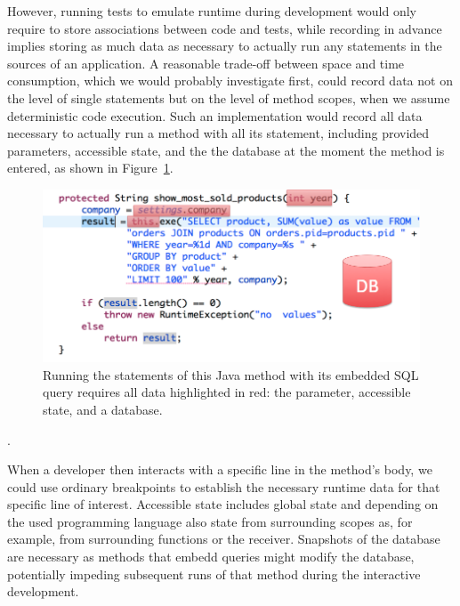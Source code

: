 However, running tests to emulate runtime during development would only require to store associations between code and tests, while recording in advance implies storing as much data as necessary to actually run any statements in the sources of an application.
A reasonable trade-off between space and time consumption, which we would probably investigate first, could record data not on the level of single statements but on the level of method scopes, when we assume deterministic code execution.
Such an implementation would record all data necessary to actually run a method with all its statement, including provided parameters, accessible state, and the the database at the moment the method is entered, as shown in Figure~\ref{fig:context_recording}.

\begin{figure}
    \includegraphics[width=\linewidth]{images/context_recording}
    \caption{Running the statements of this Java method with its embedded SQL query requires all data highlighted in red: the parameter, accessible state, and a database.}
    \label{fig:context_recording}
\end{figure}.

When a developer then interacts with a specific line in the method's body, we could use ordinary breakpoints to establish the necessary runtime data for that specific line of interest. 
Accessible state includes global state and depending on the used programming language also state from surrounding scopes as, for example, from surrounding functions or the receiver.
Snapshots of the database are necessary as methods that embedd queries might modify the database, potentially impeding subsequent runs of that method during the interactive development.

